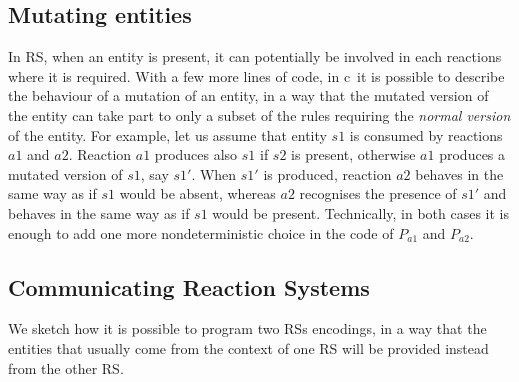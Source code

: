 \subsection{Mutating entities} 
In RS, when an entity is present, it can potentially be involved in each reactions where it is required.
With a few more lines of code, in c\CNA~it is possible to describe the behaviour of a mutation of 
an entity, in a way that the mutated version of the entity can take 
part to only a subset of the rules requiring  the  \emph{normal version} of the entity.
For example, let us assume that entity $s1$ is consumed by reactions $a1$ and $a2$.
Reaction $a1$ produces also $s1$ if $s2$ is present, otherwise $a1$ produces a mutated version of $s1$, 
say $s1'$.
When $s1'$ is produced, reaction $a2$ behaves in the same way as if $s1$ would be absent, whereas $a2$
recognises the presence of $s1'$ and behaves in the same way as if $s1$ would be present.
Technically, in both cases it is enough to add one more nondeterministic choice in the code of $P_{a1}$ and $P_{a2}$. 


\subsection{Communicating Reaction Systems}
\label{subsec:comRS}
We sketch how it is possible to program two RSs encodings, in a way that
the entities that usually come from the context of one RS will be provided instead from the other RS.


